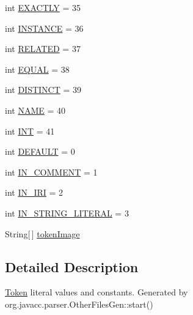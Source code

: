 \begin{DoxyCompactItemize}
\item 
int \hyperlink{interfaceorg_1_1coode_1_1owl_1_1krssparser_1_1_k_r_s_s_parser_constants_ae825a562608fcb7d1aed97d72532a21e}{E\-X\-A\-C\-T\-L\-Y} = 35
\item 
int \hyperlink{interfaceorg_1_1coode_1_1owl_1_1krssparser_1_1_k_r_s_s_parser_constants_a5384fe808bfb78f337c4599b9724368f}{I\-N\-S\-T\-A\-N\-C\-E} = 36
\item 
int \hyperlink{interfaceorg_1_1coode_1_1owl_1_1krssparser_1_1_k_r_s_s_parser_constants_ad8b00a5fe556346d3e5af2c2956ade84}{R\-E\-L\-A\-T\-E\-D} = 37
\item 
int \hyperlink{interfaceorg_1_1coode_1_1owl_1_1krssparser_1_1_k_r_s_s_parser_constants_a8151d419863a70872680276d25ce3338}{E\-Q\-U\-A\-L} = 38
\item 
int \hyperlink{interfaceorg_1_1coode_1_1owl_1_1krssparser_1_1_k_r_s_s_parser_constants_a3022065d1fd2babbe48d76a54ce313a7}{D\-I\-S\-T\-I\-N\-C\-T} = 39
\item 
int \hyperlink{interfaceorg_1_1coode_1_1owl_1_1krssparser_1_1_k_r_s_s_parser_constants_a10357c9127e82479bb4d7b6efa887ff6}{N\-A\-M\-E} = 40
\item 
int \hyperlink{interfaceorg_1_1coode_1_1owl_1_1krssparser_1_1_k_r_s_s_parser_constants_a350f690a9bce3617ff4dd52dd7b62e04}{I\-N\-T} = 41
\item 
int \hyperlink{interfaceorg_1_1coode_1_1owl_1_1krssparser_1_1_k_r_s_s_parser_constants_add3f2154a338758d10d484128a71879d}{D\-E\-F\-A\-U\-L\-T} = 0
\item 
int \hyperlink{interfaceorg_1_1coode_1_1owl_1_1krssparser_1_1_k_r_s_s_parser_constants_a8a07270f2a3c6c6e60fae2402867914f}{I\-N\-\_\-\-C\-O\-M\-M\-E\-N\-T} = 1
\item 
int \hyperlink{interfaceorg_1_1coode_1_1owl_1_1krssparser_1_1_k_r_s_s_parser_constants_ac94d1dd7ba4164281caefd7605b56094}{I\-N\-\_\-\-I\-R\-I} = 2
\item 
int \hyperlink{interfaceorg_1_1coode_1_1owl_1_1krssparser_1_1_k_r_s_s_parser_constants_a69a01634484b7537a04735c210d02120}{I\-N\-\_\-\-S\-T\-R\-I\-N\-G\-\_\-\-L\-I\-T\-E\-R\-A\-L} = 3
\item 
String\mbox{[}$\,$\mbox{]} \hyperlink{interfaceorg_1_1coode_1_1owl_1_1krssparser_1_1_k_r_s_s_parser_constants_ae55181fdc0a59a848dc604737bdc6099}{token\-Image}
\end{DoxyCompactItemize}


\subsection{Detailed Description}
\hyperlink{classorg_1_1coode_1_1owl_1_1krssparser_1_1_token}{Token} literal values and constants. Generated by org.\-javacc.\-parser.\-Other\-Files\-Gen\-::start() 

